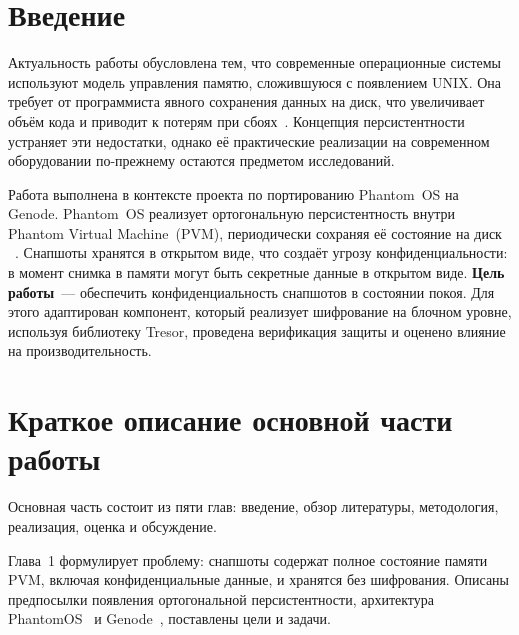 \documentclass[oneside,final,14pt,a4paper]{extreport}
\theoremstyle{definition}
\theoremstyle{remark}
\theoremstyle{remark}
\begin{document}

\tableofcontents
\newpage


% 
\setcounter{page}{3}
\setcounter{section}{0}

\section{Введение}

Актуальность работы обусловлена тем, что современные операционные системы используют модель управления памятю, сложившуюся с появлением UNIX. Она требует от программиста явного сохранения данных на диск, что увеличивает объём кода и приводит к потерям при сбоях~\cite{PLA}. Концепция персистентности устраняет эти недостатки, однако её практические реализации на современном оборудовании по-прежнему остаются предметом исследований.

Работа выполнена в контексте проекта по портированию Phantom~OS на Genode. Phantom~OS реализует ортогональную персистентность внутри Phantom Virtual Machine~(PVM), периодически сохраняя её состояние на диск ~\cite{Phantom_docs,OSP_Phantom_article}. Снапшоты хранятся в открытом виде, что создаёт угрозу конфиденциальности: в момент снимка в памяти могут быть секретные данные в открытом виде. \textbf{Цель работы}~--- обеспечить конфиденциальность снапшотов в состоянии покоя. Для этого адаптирован компонент, который реализует шифрование на блочном уровне, используя библиотеку Tresor, проведена верификация защиты и оценено влияние на производительность.

\section{Краткое описание основной части работы}

Основная часть состоит из пяти глав: введение, обзор литературы, методология, реализация, оценка и обсуждение.

Глава~1 формулирует проблему: снапшоты содержат полное состояние памяти PVM, включая конфиденциальные данные, и хранятся без шифрования. Описаны предпосылки появления ортогональной персистентности, архитектура PhantomOS~\cite{Phantom_docs} и Genode~\cite{Genode_Foundations}, поставлены цели и задачи.
\end{document}
